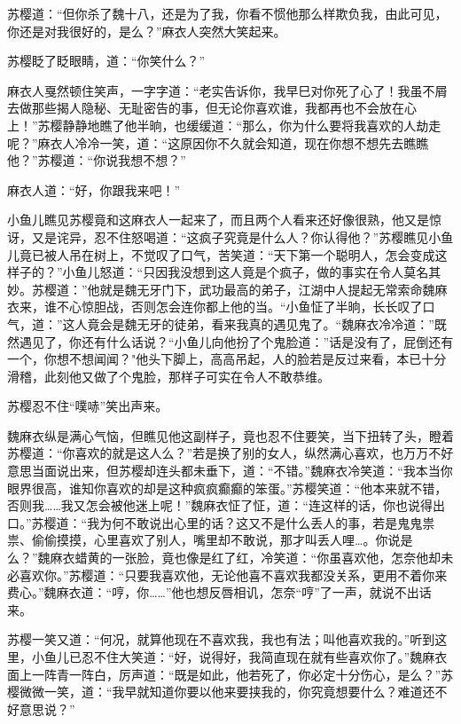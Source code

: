 \documentclass[12pt,oneside]{book}
\begin{document}
苏樱道：``但你杀了魏十八，还是为了我，你看不惯他那么样欺负我，由此可见，你还是对我很好的，是么？''麻衣人突然大笑起来。

苏樱眨了眨眼睛，道：``你笑什么？''

麻衣人戛然顿住笑声，一字字道：``老实告诉你，我早巳对你死了心了！我虽不屑去做那些揭人隐秘、无耻密告的事，但无论你喜欢谁，我都再也不会放在心上！''苏樱静静地瞧了他半晌，也缓缓道：``那么，你为什么要将我喜欢的人劫走呢？''麻衣人冷冷一笑，道：``这原因你不久就会知道，现在你想不想先去瞧瞧他？''苏樱道：``你说我想不想？''

麻衣人道：``好，你跟我来吧！''

小鱼儿瞧见苏樱竟和这麻衣人一起来了，而且两个人看来还好像很熟，他又是惊讶，又是诧异，忍不住怒喝道：``这疯子究竟是什么人？你认得他？''苏樱瞧见小鱼儿竟已被人吊在树上，不觉叹了口气，苦笑道：``天下第一个聪明人，怎会变成这样子的？''小鱼儿怒道：``只因我没想到这人竟是个疯子，做的事实在令人莫名其妙。苏樱道：''他就是魏无牙门下，武功最高的弟子，江湖中人提起无常索命魏麻衣来，谁不心惊胆战，否则怎会连你都上他的当。``小鱼怔了半晌，长长叹了口气，道：''这人竟会是魏无牙的徒弟，看来我真的遇见鬼了。``魏麻衣冷冷道：''既然遇见了，你还有什么话说？``小鱼儿向他扮了个鬼脸道：''话是没有了，屁倒还有一个，你想不想闻闻？"他头下脚上，高高吊起，人的脸若是反过来看，本已十分滑稽，此刻他又做了个鬼脸，那样子可实在令人不敢恭维。

苏樱忍不住``噗哧''笑出声来。

魏麻衣纵是满心气恼，但瞧见他这副样子，竟也忍不住要笑，当下扭转了头，瞪着苏樱道：``你喜欢的就是这人么？''若是换了别的女人，纵然满心喜欢，也万万不好意思当面说出来，但苏樱却连头都未垂下，道：``不错。''魏麻衣冷笑道：``我本当你眼界很高，谁知你喜欢的却是这种疯疯癫癫的笨蛋。''苏樱笑道：``他本来就不错，否则我\ldots\ldots 我又怎会被他迷上呢！''魏麻衣怔了怔，道：``连这样的话，你也说得出口。''苏樱道：``我为何不敢说出心里的话？这又不是什么丢人的事，若是鬼鬼祟祟、偷偷摸摸，心里喜欢了别人，嘴里却不敢说，那才叫丢人哩\ldots。你说是么？''魏麻衣蜡黄的一张脸，竟也像是红了红，冷笑道：``你虽喜欢他，怎奈他却未必喜欢你。''苏樱道：``只要我喜欢他，无论他喜不喜欢我都没关系，更用不着你来费心。''魏麻衣道：``哼，你\ldots\ldots{}''他也想反唇相讥，怎奈``哼''了一声，就说不出话来。

苏樱一笑又道：``何况，就算他现在不喜欢我，我也有法；叫他喜欢我的。''听到这里，小鱼儿已忍不住大笑道：``好，说得好，我简直现在就有些喜欢你了。''魏麻衣面上一阵青一阵白，厉声道：``既是如此，他若死了，你必定十分伤心，是么？''苏樱微微一笑，道：``我早就知道你要以他来要挟我的，你究竟想要什么？难道还不好意思说？''
\end{document}
